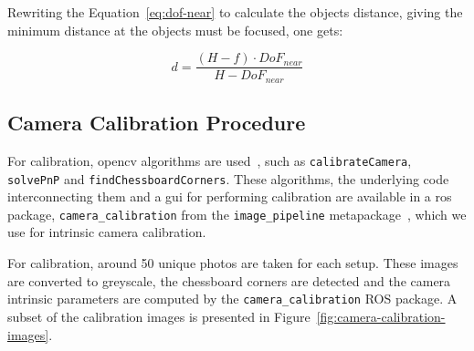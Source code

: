 Rewriting the Equation~\eqref{eq:dof-near} to calculate the objects distance, giving the minimum distance at the objects must be focused, one gets: %

\begin{equation}
	\label{eq:dof-subject-distance}
	d = \frac{(H - f) \cdot DoF_{near}}{H - DoF_{near}}
\end{equation}


\subsection{Camera Calibration Procedure}
For calibration, \ac{opencv} algorithms are used~\cite{opencv_doc}, such as \texttt{calibrateCamera}, \texttt{solvePnP} and \texttt{findChessboardCorners}. These algorithms, the underlying code interconnecting them and a \ac{gui} for performing calibration are available in a \ac{ros} package, \texttt{camera\_calibration} from the \texttt{image\_pipeline} metapackage~\cite{cameraCalibrationRos}, which we use for intrinsic camera calibration.

For calibration, around 50 unique photos are taken for each setup. These images are converted to greyscale, the chessboard corners are detected and the camera intrinsic parameters are computed by the \texttt{camera\_calibration} ROS package. A subset of the calibration images is presented in Figure~\ref{fig:camera-calibration-images}.

